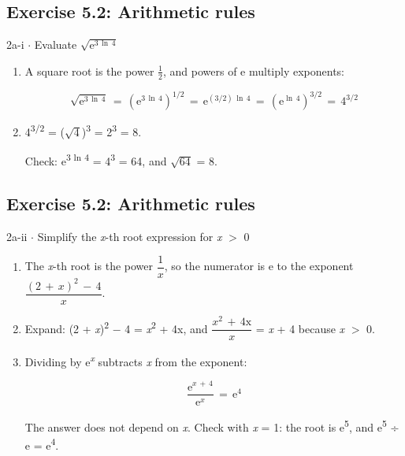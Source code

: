 \documentclass[11pt]{article}
\begin{document}
\begin{keepsection}\subsection{Exercise 5.2: Arithmetic rules}

\begin{workedbox}{2a-i \ensuremath{\cdot} Evaluate \ensuremath{\sqrt{\mathrm{e}^{3\, \ln \, 4}}}}
\begin{enumerate}
\item {}
A square root is the power \ensuremath{\tfrac12}, and powers of e multiply exponents:

\begin{equation*}\sqrt{\mathrm{e}^{3\, \ln \, 4}}\, =\, (\mathrm{e}^{3\, \ln \, 4})^{1/2}\, =\, \mathrm{e}^{(3/2)\, \ln \, 4}\, =\, (\mathrm{e}^{\ln \, 4})^{3/2}\, =\, 4^{3/2}\end{equation*}
\item {}
4\textsuperscript{3/2} = (\ensuremath{\sqrt{4}})\textsuperscript{3} = 2\textsuperscript{3} = 8.

Check: e\textsuperscript{3 ln 4} = 4\textsuperscript{3} = 64, and \ensuremath{\sqrt{64}} = 8.
\end{enumerate}
\end{workedbox}

\end{keepsection}
\begin{keepsection}\subsection{Exercise 5.2: Arithmetic rules}

\begin{workedbox}{2a-ii \ensuremath{\cdot} Simplify the \textit{x}-th root expression for \textit{x} \ensuremath{>} 0}
\begin{enumerate}
\item The \textit{x}-th root is the power {\small\ensuremath{\dfrac{1}{{x}}}}, so the numerator is e to the exponent {\small\ensuremath{\dfrac{(2\, +\, {x})^{2}\, -\, 4}{{x}}}}.
\item Expand: (2 + \textit{x})\textsuperscript{2} \ensuremath{-} 4 = \textit{x}\textsuperscript{2} + 4x, and {\small\ensuremath{\dfrac{{x}^{2}\, +\, 4\mathrm{x}}{{x}}}} = \textit{x} + 4 because \textit{x} \ensuremath{>} 0.
\item {}
Dividing by e\textsuperscript{\textit{x}} subtracts \textit{x} from the exponent:

\begin{equation*}\dfrac{\mathrm{e}^{{x}\, +\, 4}}{\mathrm{e}^{{x}}}\, =\, \mathrm{e}^{4}\end{equation*}

The answer does not depend on \textit{x}. Check with \textit{x} = 1: the root is e\textsuperscript{5}, and e\textsuperscript{5} ÷ e = e\textsuperscript{4}.
\end{enumerate}
\end{workedbox}

\end{keepsection}
\end{document}
